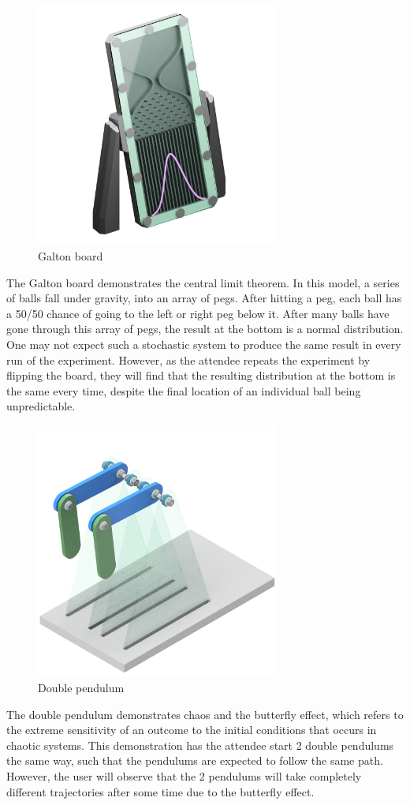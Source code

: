 \documentclass[12pt, a4paper]{article}
\begin{document}
\begin{figure}[H]
    \centering
    \includegraphics[width=8cm]{GaltonBoard-render-sticker.png}
    \caption{Galton board}
    \label{galtonboard}
\end{figure}
The Galton board demonstrates the central limit theorem. In this model, a series of balls fall under gravity, into an array of pegs. After hitting a peg, each ball has a 50/50 chance of going to the left or right peg below it. After many balls have gone through this array of pegs, the result at the bottom is a normal distribution. 
One may not expect such a stochastic system to produce the same result in every run of the experiment. However, as the attendee repeats the experiment by flipping the board, they will find that the resulting distribution at the bottom is the same every time, despite the final location of an individual ball being unpredictable. 

\begin{figure}[H]
    \centering
    \includegraphics[width=8cm]{DBP-assembly-render.png}
    \caption{Double pendulum}
    \label{}
\end{figure}
The double pendulum demonstrates chaos and the butterfly effect, which refers to the extreme sensitivity of an outcome to the initial conditions that occurs in chaotic systems. This demonstration has the attendee start 2 double pendulums the same way, such that the pendulums are expected to follow the same path. However, the user will observe that the 2 pendulums will take completely different trajectories after some time due to the butterfly effect.
\end{document}
